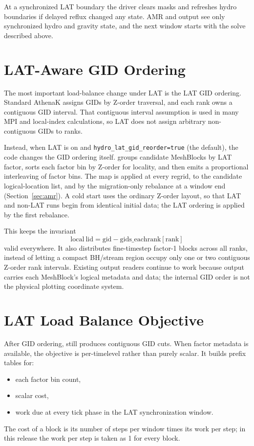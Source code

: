\documentclass[11pt]{article}
\begin{document}
At a synchronized LAT boundary the driver clears masks and refreshes hydro
boundaries if delayed reflux changed any state.  AMR and output see only
synchronized hydro and gravity state, and the next window starts with the
solve described above.

\section{LAT-Aware GID Ordering}

The most important load-balance change under LAT is the LAT GID ordering.
Standard AthenaK assigns GIDs by Z-order traversal, and each rank owns a
contiguous GID interval.  That contiguous interval assumption is used in
many MPI and local-index calculations, so LAT does not assign arbitrary
non-contiguous GIDs to ranks.

Instead, when LAT is on and \texttt{hydro\_lat\_gid\_reorder=true} (the
default), the code changes the GID ordering itself.  
groups candidate MeshBlocks by LAT factor, sorts each factor bin by Z-order for
locality, and then emits a proportional interleaving of factor bins.  The map is
applied at every regrid, to the candidate logical-location list, and by the
migration-only rebalance at a window end
(Section~\ref{sec:amr}).  A cold start uses the ordinary Z-order layout, so
that LAT and non-LAT runs begin from identical initial data; the LAT ordering is
applied by the first rebalance.

This keeps the invariant
\[
  \mathrm{local\ lid} = \mathrm{gid} - \mathrm{gids\_eachrank[rank]}
\]
valid everywhere.  It also distributes fine-timestep factor-1 blocks across
all ranks, instead of letting a compact BH/stream region occupy only one or two
contiguous Z-order rank intervals.  Existing output readers continue to work
because output carries each MeshBlock's logical metadata and data; the internal
GID order is not the physical plotting coordinate system.

\section{LAT Load Balance Objective}

After GID ordering,  still produces contiguous GID
cuts.  When factor metadata is available, the objective is per-timelevel rather
than purely scalar.  It builds prefix tables for:
\begin{itemize}
  \item each factor bin count,
  \item scalar cost,
  \item work due at every tick phase in the LAT synchronization window.
\end{itemize}
The cost of a block is its number of steps per window times its work per step;
in this release the work per step is taken as 1 for every block.
\end{document}
